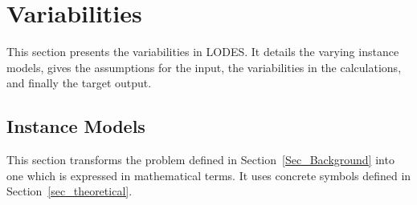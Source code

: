 \documentclass[12pt]{article}
\newcommand{\famname}{LODES} %
\begin{document}
\section{Variabilities}
This section presents the variabilities in \famname{}. It details the varying instance models,
gives the assumptions for the input, the variabilities in the calculations, and
finally the target output.

\subsection{Instance Models} \label{sec_instance}    

This section transforms the problem defined in Section~\ref{Sec_Background} into 
one which is expressed in mathematical terms. It uses concrete symbols defined 
in Section~\ref{sec_theoretical}.

~\newline

\end{document}
